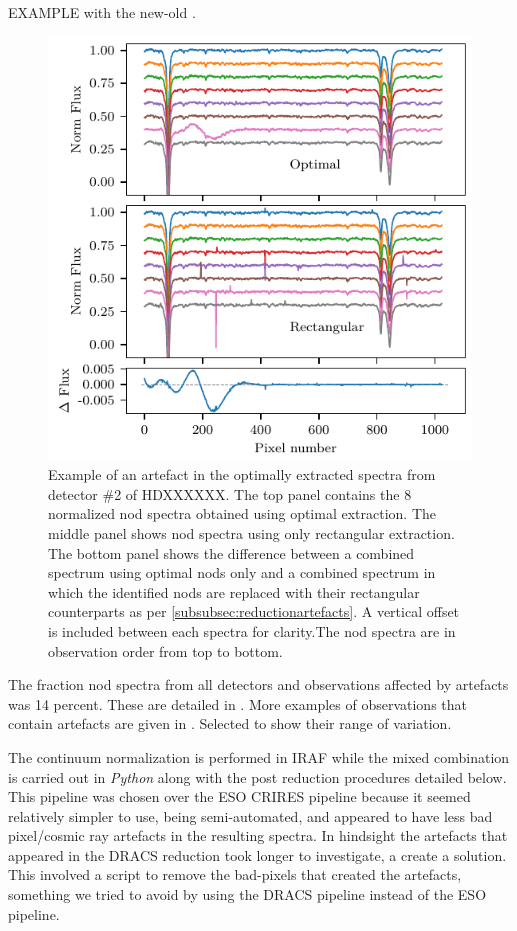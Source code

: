 EXAMPLE with the new-old .
\begin{figure}
    \centering
    \includegraphics[width=\hsize/2]{figures/reduction/Bad_pixel_replacement}
    \caption{Example of an artefact in the optimally extracted spectra from detector \#2 of {\red{} HDXXXXXX}. The top panel contains the 8 normalized nod spectra obtained using optimal extraction. The middle panel shows nod spectra using only rectangular extraction. The bottom panel shows the difference between a combined spectrum using optimal nods only and a combined spectrum in which the identified nods are replaced with their rectangular counterparts as per \ref{subsubsec:reductionartefacts}. A vertical offset is included between each spectra for clarity.The nod spectra are in observation order from top to bottom.}
    \label{fig:badpixelreplacement}
\end{figure}

The fraction nod spectra from all detectors and observations affected by artefacts was 14 percent. These are detailed in . More examples of observations that contain artefacts are given in . Selected to show their range of variation.


The continuum normalization is performed in IRAF while the mixed combination is carried out in \emph{Python} along with the post reduction procedures detailed below. This pipeline was chosen over the ESO CRIRES pipeline because it seemed relatively simpler to use, being semi-automated, and appeared to have less bad pixel/cosmic ray artefacts in the resulting spectra. In hindsight the artefacts that appeared in the DRACS reduction took longer to investigate, a create a solution. This involved a script to remove the bad-pixels that created the artefacts, something we tried to avoid by using the DRACS pipeline instead of the ESO pipeline.


